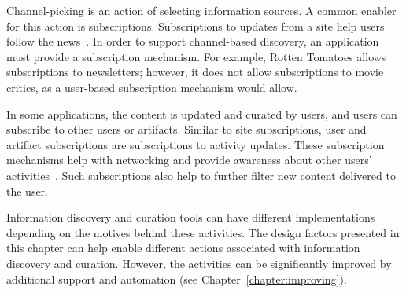 {{{Channel-picking is an action of selecting information sources. A common enabler for this action is subscriptions. Subscriptions to updates from a site help users follow the news~\cite{java2007feeds}. In order to support channel-based discovery, an application must provide a subscription mechanism. For example, Rotten Tomatoes allows subscriptions to newsletters; however, it does not allow subscriptions to movie critics, as a user-based subscription mechanism would allow. 

In some applications, the content is updated and curated by users, and users can subscribe to other users or artifacts. Similar to site subscriptions, user and artifact subscriptions are subscriptions to activity updates. These subscription mechanisms help with networking and provide awareness about other users' activities~\cite{millen2005social}. Such subscriptions also help to further filter new content delivered to the user. 
} %
} %

Information discovery and curation tools can have different implementations depending on the motives behind these activities. The design factors presented in this chapter can help enable different actions associated with information discovery and curation. However, the activities can be significantly improved by additional support and automation (see Chapter~\ref{chapter:improving}).
} %










